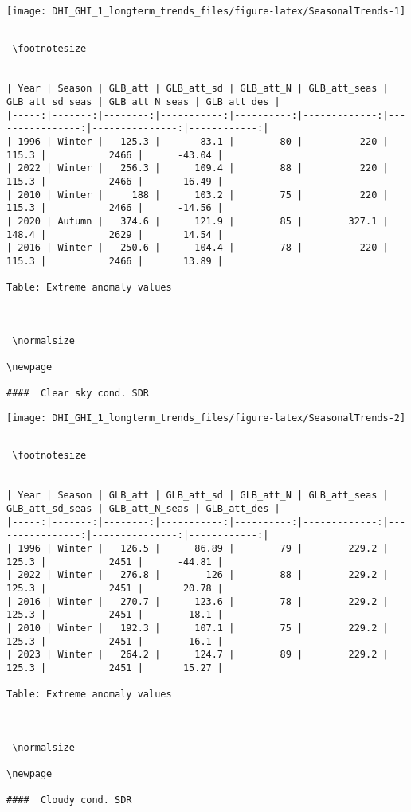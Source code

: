 \documentclass[
  10pt,
  a4paper,oneside]{article}
\begin{document}
\begin{center}\texttt{[image: DHI\_GHI\_1\_longterm\_trends\_files/figure-latex/SeasonalTrends-1]} \end{center}

\begin{verbatim}
 
 \footnotesize 
 

| Year | Season | GLB_att | GLB_att_sd | GLB_att_N | GLB_att_seas | GLB_att_sd_seas | GLB_att_N_seas | GLB_att_des |
|-----:|-------:|--------:|-----------:|----------:|-------------:|----------------:|---------------:|------------:|
| 1996 | Winter |   125.3 |       83.1 |        80 |          220 |           115.3 |           2466 |      -43.04 |
| 2022 | Winter |   256.3 |      109.4 |        88 |          220 |           115.3 |           2466 |       16.49 |
| 2010 | Winter |     188 |      103.2 |        75 |          220 |           115.3 |           2466 |      -14.56 |
| 2020 | Autumn |   374.6 |      121.9 |        85 |        327.1 |           148.4 |           2629 |       14.54 |
| 2016 | Winter |   250.6 |      104.4 |        78 |          220 |           115.3 |           2466 |       13.89 |

Table: Extreme anomaly values


 
 \normalsize 
 
\newpage

####  Clear sky cond. SDR 
\end{verbatim}

\begin{center}\texttt{[image: DHI\_GHI\_1\_longterm\_trends\_files/figure-latex/SeasonalTrends-2]} \end{center}

\begin{verbatim}
 
 \footnotesize 
 

| Year | Season | GLB_att | GLB_att_sd | GLB_att_N | GLB_att_seas | GLB_att_sd_seas | GLB_att_N_seas | GLB_att_des |
|-----:|-------:|--------:|-----------:|----------:|-------------:|----------------:|---------------:|------------:|
| 1996 | Winter |   126.5 |      86.89 |        79 |        229.2 |           125.3 |           2451 |      -44.81 |
| 2022 | Winter |   276.8 |        126 |        88 |        229.2 |           125.3 |           2451 |       20.78 |
| 2016 | Winter |   270.7 |      123.6 |        78 |        229.2 |           125.3 |           2451 |        18.1 |
| 2010 | Winter |   192.3 |      107.1 |        75 |        229.2 |           125.3 |           2451 |       -16.1 |
| 2023 | Winter |   264.2 |      124.7 |        89 |        229.2 |           125.3 |           2451 |       15.27 |

Table: Extreme anomaly values


 
 \normalsize 
 
\newpage

####  Cloudy cond. SDR 
\end{verbatim}
\end{document}

